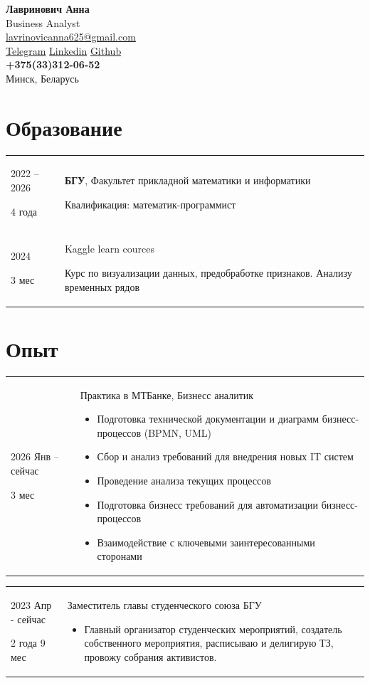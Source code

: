 \documentclass[12pt]{article}
\newcommand{\mytitle}[5]{
  \begin{center}
        \Large\textbf{#1}\normalsize \\
        \vspace{2pt}
        \Large{#2}\normalsize \\
        \href{mailto:#3}{#3} \\ 
        \href{https://t.me/a_smurfetta}{Telegram}
        \hspace{15pt}
        \href{https://www.linkedin.com/in/nura-lavrinovich-0a426a353/}{Linkedin}
        \hspace{15pt}
        \href{https://github.com/annlavra}{Github} \\
        \vspace{5pt}
        \textbf{#4} \\ 
        #5
  \end{center}
}
\begin{document}
\mytitle{Лавринович Анна}{Business Analyst}{lavrinovicanna625@gmail.com}{+375(33)312-06-52}{Минск, Беларусь}

\thispagestyle{empty}

\section*{Образование}
\begin{longtable}[l]{@{}p{} p{}}
    2022 -- 2026
    
    4 года
    & 

    \textbf{БГУ}, Факультет прикладной математики и информатики

    
    Квалификация: математик-программист
    \vspace{15pt}
    \\

    2024 

    3 мес
    &
    Kaggle learn cources

    Курс по визуализации данных, предобработке признаков. Анализу временных рядов  
\end{longtable}

\section*{Опыт}

\begin{longtable}[l]{@{}p{} p{}}
    2026 Янв -- сейчас
    
    3 мес
    & Практика в МТБанке, Бизнесс аналитик
    \begin{itemize}[before=\setlength{\baselineskip}{0pt}, itemsep=2pt]
        \item Подготовка технической документации и диаграмм бизнесс-процессов (BPMN, UML)
        \item Сбор и анализ требований для внедрения новых IT систем
        \item Проведение анализа текущих процессов
        \item Подготовка бизнесс требований для автоматизации бизнесс-процессов
        \item Взаимодействие с ключевыми заинтересованными сторонами
    \end{itemize}
\end{longtable}

\begin{longtable}[l]{@{}p{} p{}}
    2023 Апр - сейчас 
    
    2 года 9 мес
    & Заместитель главы студенческого союза БГУ
    \begin{itemize}[before=\setlength{\baselineskip}{0pt}, itemsep=2pt]
        \item Главный организатор студенческих мероприятий, создатель собственного мероприятия, расписываю и делигирую ТЗ, провожу собрания активистов.
    \end{itemize}
\end{longtable}
\end{document}
